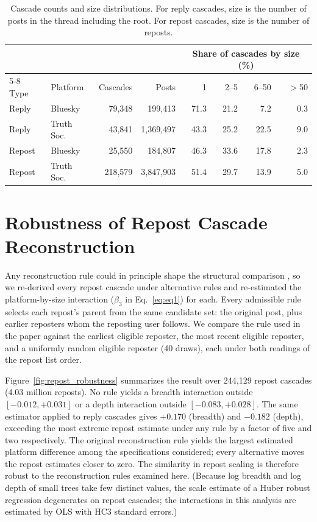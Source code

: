 \documentclass[letterpaper]{article} %
\newcommand{\rev}[1]{{\color{blue}#1}}
\begin{document}
\begin{table}[t]
\centering
\footnotesize
\setlength{\tabcolsep}{3.5pt}
\rev{
\begin{tabular}{llrrrrrr}
\toprule
 & & & & \multicolumn{4}{c}{Share of cascades by size (\%)} \\
\cmidrule(lr){5-8}
Type & Platform & Cascades & Posts & 1 & 2--5 & 6--50 & $>$50 \\
\midrule
Reply & Bluesky & 79{,}348 & 199{,}413 & 71.3 & 21.2 & 7.2 & 0.3 \\
Reply & Truth Soc. & 43{,}841 & 1{,}369{,}497 & 43.3 & 25.2 & 22.5 & 9.0 \\
Repost & Bluesky & 25{,}550 & 184{,}807 & 46.3 & 33.6 & 17.8 & 2.3 \\
Repost & Truth Soc. & 218{,}579 & 3{,}847{,}903 & 51.4 & 29.7 & 13.9 & 5.0 \\
\bottomrule
\end{tabular}
}
\caption{\rev{Cascade counts and size distributions. For reply cascades, size is the number of posts in the thread including the root. For repost cascades, size is the number of reposts.}}
\label{tab:descriptives}
\end{table}

\section{\rev{Robustness of Repost Cascade Reconstruction}}

\rev{Any reconstruction rule could in principle shape the structural comparison \citep{deverna_cascade_2024}, so we re-derived every repost cascade under alternative rules and re-estimated the platform-by-size interaction ($\beta_3$ in Eq.~\ref{eq:eq1}) for each. Every admissible rule selects each repost's parent from the same candidate set: the original post, plus earlier reposters whom the reposting user follows. We compare the rule used in the paper against the earliest eligible reposter, the most recent eligible reposter, and a uniformly random eligible reposter (40 draws), each under both readings of the repost list order.}

\rev{Figure~\ref{fig:repost_robustness} summarizes the result over 244{,}129 repost cascades (4.03 million reposts). No rule yields a breadth interaction outside $[-0.012, +0.031]$ or a depth interaction outside $[-0.083, +0.028]$. The same estimator applied to reply cascades gives $+0.170$ (breadth) and $-0.182$ (depth), exceeding the most extreme repost estimate under any rule by a factor of five and two respectively. The original reconstruction rule yields the largest estimated platform difference among the specifications considered; every alternative moves the repost estimates closer to zero. The similarity in repost scaling is therefore robust to the reconstruction rules examined here. (Because log breadth and log depth of small trees take few distinct values, the scale estimate of a Huber robust regression degenerates on repost cascades; the interactions in this analysis are estimated by OLS with HC3 standard errors.)}
\end{document}
